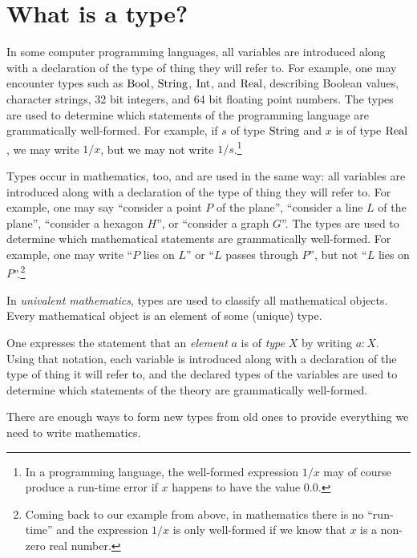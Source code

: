 \label{ch:univalent-mathematics}

\section{What is a type?}
\label{sec:what-is-a-type}

In some computer programming languages, all variables are introduced along with a declaration of the type of thing they will refer to.  For example,
one may encounter types such as $\mathrm{Bool}$, $\mathrm{String}$, $\mathrm{Int}$, and $\mathrm{Real}$, describing Boolean values, character strings, 32 bit integers, and 64 bit
floating point numbers.  The types are used to determine which statements of the programming language are grammatically well-formed.
For example, if $s$ of type $\mathrm{String}$ and $x$ is of type $\mathrm{Real}$, we may write $1/x$, but we may not write $1/s$.\footnote{%
  In a programming language, the well-formed expression $1/x$ may of course
  produce a run-time error if $x$ happens to have the value $0{.}0$.}

Types occur in mathematics, too, and are used in the same way: all variables are introduced along with a declaration of the type of thing they
will refer to.  For example, one may say ``consider a point $P$ of the plane'', ``consider a line $L$ of the plane'', ``consider a hexagon
$H$'', or ``consider a graph $G$''.  The types are used to determine which mathematical statements are grammatically well-formed.  For example,
one may write ``$P$ lies on $L$'' or ``$L$ passes through $P$'', but not ``$L$ lies on $P$''.\footnote{%
  Coming back to our example from above, in mathematics there is no ``run-time''
  and the expression $1/x$ is only well-formed if we know that $x$ is a non-zero
  real number.}

In \emph{univalent mathematics}, types are used to classify all mathematical objects.  Every mathematical object is an element of some (unique)
type.

One expresses the statement that an \emph{element} $a$ is of \emph{type} $X$ by writing $a:X$.  Using that notation, each variable is introduced along
with a declaration of the type of thing it will refer to, and the declared types of the variables are used to determine which statements of the
theory are grammatically well-formed.

There are enough ways to form new types from old ones to provide everything we need to write mathematics.

